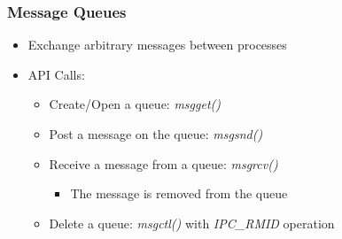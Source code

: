 \begin{frame}
  \frametitle{Message Queues}

  \begin{itemize}
  \item Exchange arbitrary messages between processes
  \item API Calls:
    \begin{itemize}
    \item Create/Open a queue: \emph{msgget()}
    \item Post a message on the queue: \emph{msgsnd()}
    \item Receive a message from a queue: \emph{msgrcv()}
      \begin{itemize}
      \item The message is removed from the queue
      \end{itemize}
    \item Delete a queue: \emph{msgctl()} with \emph{IPC\_RMID} operation
    \end{itemize}
  \end{itemize}
\end{frame}
